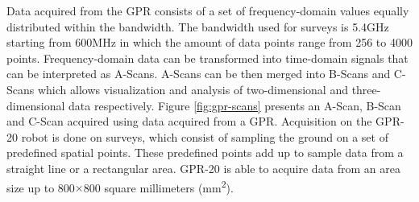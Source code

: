 \documentclass{article}
\begin{document}
Data acquired from the GPR consists of a set of frequency-domain values equally distributed within the bandwidth. The bandwidth used for surveys is 5.4GHz starting from 600MHz in which the amount of data points range from 256 to 4000 points. Frequency-domain data can be transformed into time-domain signals that can be interpreted as A-Scans. A-Scans can be then merged into B-Scans and C-Scans which allows visualization and analysis of two-dimensional and three-dimensional data respectively. Figure \ref{fig:gpr-scans} presents an A-Scan, B-Scan and C-Scan acquired using data acquired from a GPR. Acquisition on the GPR-20 robot is done on surveys, which consist of sampling the ground on a set of predefined spatial points. These predefined points add up to sample data from a straight line or a rectangular area. GPR-20 is able to acquire data from an area size up to 800$\times$800 square millimeters (mm\textsuperscript{2}).
\end{document}
